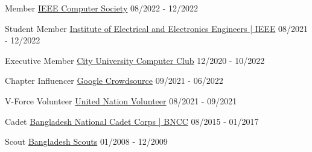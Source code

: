 

\begin{cvhonors}

    

    
  \cvhonor
    {Member} %
    {\href{https://www.computer.org/}{IEEE Computer Society}} %
    {} %
    {08/2022 - 12/2022} %


 
 \cvhonor
    {Student Member} %
    {\href{https://www.ieee.org/}{Institute of Electrical and Electronics Engineers | IEEE}} %
    {} %
    {08/2021 - 12/2022} %

  \cvhonor
    {Executive Member} %
    {\href{https://cityuniversity.ac.bd/}{City University Computer Club}} %
    {} %
    {12/2020 - 10/2022} %

 
  \cvhonor
    {Chapter Influencer} %
    {\href{https://crowdsource.google.com/about/}{Google Crowdsource}} %
    {} %
    {09/2021 - 06/2022} %

  \cvhonor
    {V-Force Volunteer} %
    {\href{https://www.unv.org/}{United Nation Volunteer}} %
    {} %
    {08/2021 - 09/2021} %

 

  \cvhonor
    {Cadet} %
    {\href{https://bncc.info/}{Bangladesh National Cadet Corps | BNCC}} %
    {} %
    {08/2015 - 01/2017} %

  \cvhonor
    {Scout} %
    {\href{http://www.scouts.gov.bd/}{Bangladesh Scouts}} %
    {} %
    {01/2008 - 12/2009} %



\end{cvhonors}